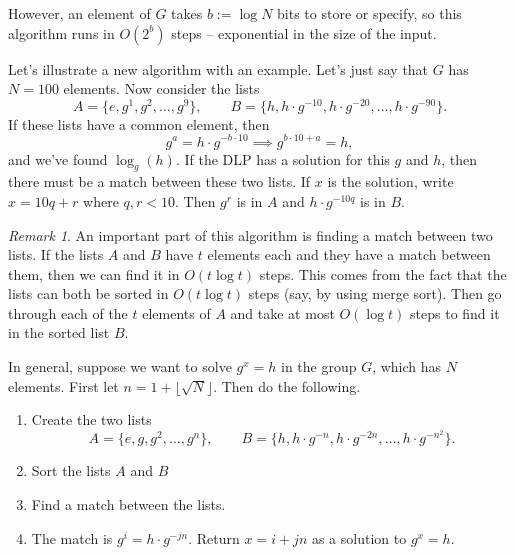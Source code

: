 \documentclass[12pt]{article}
\theoremstyle{plain}
\theoremstyle{definition}
\theoremstyle{remark}
\newtheorem{remark}[theorem]{Remark}
\begin{document}
However, an element of $G$ takes $b := \log N$ bits to store or specify, so this algorithm runs in $O(2^b)$ steps -- exponential in the size of the input.


Let's illustrate a new algorithm with an example.
Let's just say that $G$ has $N = 100$ elements.
Now consider the lists
\[
    A = \{e, g^1, g^2, \ldots, g^9\},\qquad B = \{h,h\cdot g^{-10}, h\cdot g^{-20},\ldots, h\cdot g^{-90} \}.
\]
If these lists have a common element, then
\[
    g^a = h\cdot g^{-b\cdot 10} \implies g^{b\cdot 10 + a} = h,
\]
and we've found $\log_g(h)$.
If the DLP has a solution for this $g$ and $h$, then there must be a match between these two lists.
If $x$ is the solution, write $x = 10q + r$ where $q,r<10$.
Then $g^r$ is in $A$ and $h\cdot g^{-10q}$ is in $B$.
\begin{remark}
    An important part of this algorithm is finding a match between two lists.
    If the lists $A$ and $B$ have $t$ elements each and they have a match between them, then we can find it in $O(t\log t)$ steps.
    This comes from the fact that the lists can both be sorted in $O(t \log t)$ steps (say, by using merge sort).
    Then go through each of the $t$ elements of $A$ and take at most $O(\log t)$ steps to find it in the sorted list $B$.
\end{remark}

In general, suppose we want to solve $g^x = h$ in the group $G$, which has $N$ elements.
First let $n = 1 + \lfloor \sqrt{N}\rfloor$.
Then do the following.
\begin{enumerate}
    \item Create the two lists
    \[
        A = \{e, g, g^2, \ldots, g^n\},\qquad B = \{h, h\cdot g^{-n}, h\cdot g^{-2n}, \ldots, h\cdot g^{-n^2}\}.
    \]

    \item Sort the lists $A$ and $B$

    \item Find a match between the lists.

    \item The match is $g^i = h\cdot g^{-jn}$. Return $x = i +jn$ as a solution to $g^x = h$.
\end{enumerate}
\end{document}
